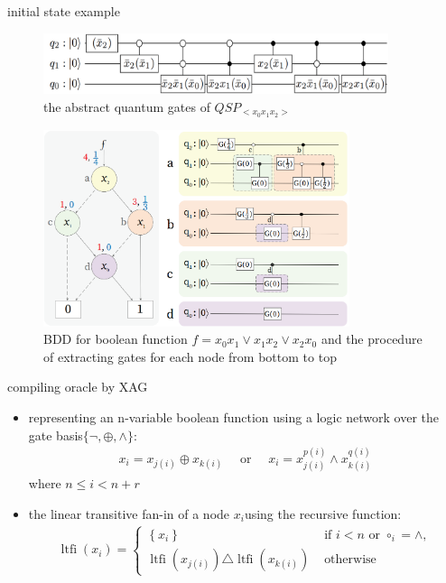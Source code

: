 \begin{frame}{initial state example}
  \begin{figure}[htbq]
    \centering
    \includegraphics[width=0.9\textwidth]{figure/qsp_example.png}
    \caption{the abstract quantum gates of $QSP_{<x_0x_1x_2>}$} 
    \label{fig-qsp-example}
  \end{figure}
\end{frame}
\begin{frame}
  \begin{figure}[htbq]
    \centering
    \includegraphics[width=0.8\textwidth]{figure/qsp_circuit.png}
    \caption{BDD  for boolean function $f= x_0x_1\vee x_1x_2 \vee x_2x_0 $ and  the  procedure  of  extracting  gates  for  each node from bottom to top} 
    \label{fig-qsp-example-circuit}
  \end{figure}
\end{frame}
\begin{frame}{compiling oracle by XAG}
  \begin{itemize}
    \item representing an n-variable boolean function using a logic network over the gate basis$\{\lnot ,\oplus ,\wedge \}$:
    \begin{align}
      x_{i} = x_{j(i)} \oplus x_{k(i)} \quad \text { or } \quad x_{i} = x_{j(i)}^{p(i)} \wedge x_{k(i)}^{q(i)}
    \end{align}
    where $n\leq i < n+r$
    \item  the linear transitive fan-in of a node $x_i $using the recursive function:
    \begin{align}
      \operatorname{ltfi}\left(x_{i}\right) = \left\{\begin{array}{ll}
      \left\{x_{i}\right\} & \text { if } i < n \text { or } \circ_{i}  = \wedge, \\
      \operatorname{ltfi}\left(x_{j(i)}\right) \triangle \operatorname{ltfi}\left(x_{k(i)}\right) & \text { otherwise }
      \end{array}\right.
    \end{align}
  \end{itemize}
\end{frame}
